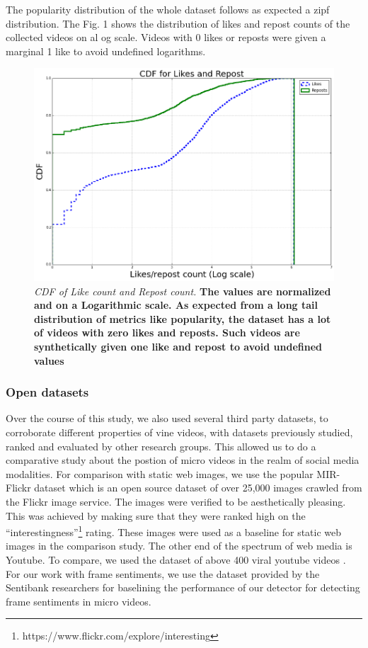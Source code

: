 The popularity distribution of the whole dataset follows as expected a zipf distribution. The Fig. 1 shows the distribution of likes and repost counts of the collected videos on al og scale. Videos with 0 likes or reposts were given a marginal 1 like to avoid undefined logarithms. 

\begin{figure}[!htb]
\centering
\includegraphics[width=\columnwidth]{plots/CDF_Like_reposts}
\caption{\textsl{ CDF of Like count and Repost count.} \textbf{The values are normalized and on a Logarithmic scale. As expected from a long tail distribution of metrics like popularity, the dataset has a lot of videos with zero likes and reposts. Such videos are synthetically given one like and repost to avoid undefined values}}
\label{fig:CDF_posts}
\end{figure}

\subsubsection{Open datasets}
Over the course of this study, we also used several third party datasets, to corroborate different properties of vine videos, with datasets previously studied, ranked and evaluated by other research groups. This allowed us to do a comparative study about the postion of micro videos in the realm of social media modalities. 
For comparison with static web images, we use the popular MIR-Flickr dataset \cite{huiskes08} which is an open source dataset of over 25,000 images crawled from the Flickr image service. The images were verified to be aesthetically pleasing. This was achieved by making sure that they were ranked high on the ``interestingness''\footnote{https://www.flickr.com/explore/interesting} rating. These images were used as a baseline for static web images in the comparison study.
The other end of the spectrum of web media is Youtube. To compare, we used the dataset of above 400 viral youtube videos \cite{Jiang:2014:VVS:2578726.2578754}. 
For our work with frame sentiments, we use the dataset provided by the Sentibank researchers \cite{jou2015visual} \cite{SentiBank} for baselining the performance of our detector for detecting frame sentiments in micro videos.


